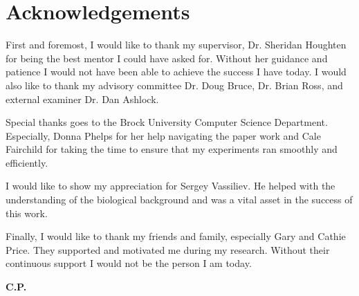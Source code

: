 \thispagestyle{empty}
\section*{Acknowledgements}


First and foremost, I would like to thank my supervisor, Dr. Sheridan Houghten for being the best mentor I could have asked for. Without her guidance and patience I would not have been able to achieve the success I have today. I would also like to thank my advisory committee Dr. Doug Bruce, Dr. Brian Ross, and external examiner Dr. Dan Ashlock.

Special thanks goes to the Brock University Computer Science Department. Especially, Donna Phelps for her help navigating the paper work and Cale Fairchild for taking the time to ensure that my experiments ran smoothly and efficiently.

I would like to show my appreciation for Sergey Vassiliev. He helped with the understanding of the biological background and was a vital asset in the success of this work.

Finally, I would like to thank my friends and family, especially Gary and Cathie Price. They supported and motivated me during my research. Without their continuous support I would not be the person I am today.

\begin{flushright}
\textbf{C.P.} %
\end{flushright}


